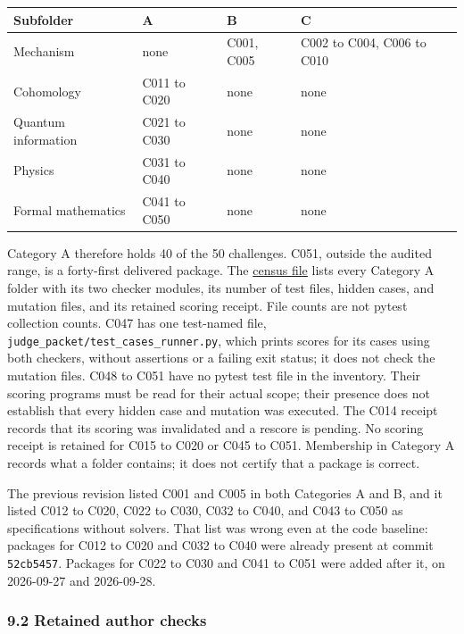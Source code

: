 \documentclass[
  11pt,
]{article}
\newcommand{\passthrough}[1]{#1}
\begin{document}
\begin{longtable}[]{@{}llll@{}}
\toprule\noalign{}
Subfolder & A & B & C \\
\midrule\noalign{}
\endhead
\bottomrule\noalign{}
\endlastfoot
Mechanism & none & C001, C005 & C002 to C004, C006 to C010 \\
Cohomology & C011 to C020 & none & none \\
Quantum information & C021 to C030 & none & none \\
Physics & C031 to C040 & none & none \\
Formal mathematics & C041 to C050 & none & none \\
\end{longtable}

Category A therefore holds 40 of the 50 challenges. C051, outside the
audited range, is a forty-first delivered package. The
\href{https://github.com/dbccpage/the_symbol_game/blob/main/omega_engine_education/documentation/030_pfp_proposal_fidelity_protocol_pfp/papers/omega_engine_symbol_game/008_pfp_mssn_tower_challenges_and_retraction_benchmarks/docs/challenge_census.md}{census
file} lists every Category A folder with its two checker modules, its
number of test files, hidden cases, and mutation files, and its retained
scoring receipt. File counts are not pytest collection counts. C047 has
one test-named file, \nolinkurl{judge_packet/test_cases_runner.py},
which prints scores for its cases using both checkers, without
assertions or a failing exit status; it does not check the mutation
files. C048 to C051 have no pytest test file in the inventory. Their
scoring programs must be read for their actual scope; their presence
does not establish that every hidden case and mutation was executed. The
C014 receipt records that its scoring was invalidated and a rescore is
pending. No scoring receipt is retained for C015 to C020 or C045 to
C051. Membership in Category A records what a folder contains; it does
not certify that a package is correct.

The previous revision listed C001 and C005 in both Categories A and B,
and it listed C012 to C020, C022 to C030, C032 to C040, and C043 to C050
as specifications without solvers. That list was wrong even at the code
baseline: packages for C012 to C020 and C032 to C040 were already
present at commit \passthrough{\lstinline!52cb5457!}. Packages for C022
to C030 and C041 to C051 were added after it, on 2026-09-27 and
2026-09-28.

\hypertarget{retained-author-checks}{%
\subsubsection{9.2 Retained author
checks}\label{retained-author-checks}}
\end{document}
